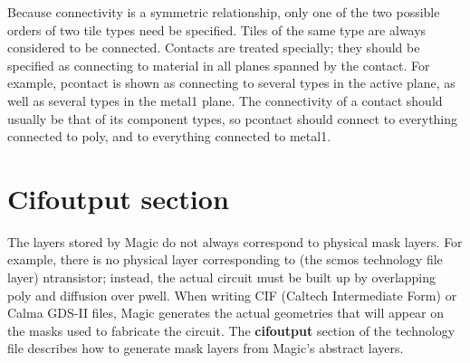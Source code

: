 \documentclass[letterpaper,twoside,12pt]{article}
\begin{document}
Because connectivity is a symmetric relationship, only one of
the two possible orders of two tile types need be specified.
Tiles of the same type
are always considered to be connected.
Contacts are treated specially; they should be specified as
connecting to material in all planes spanned by the contact.
For example, pcontact is shown as connecting to
several types in the active plane, as well as several types
in the metal1 plane.
The connectivity of a contact should usually be that
of its component types,
so pcontact should connect
to everything connected to poly, and
to everything connected to metal1.

\section{Cifoutput section}

The layers stored by Magic do not always correspond to physical
mask layers.  For example, there is no physical layer corresponding
to (the scmos technology file layer) ntransistor; instead, the actual
circuit must be built up by overlapping poly and diffusion over pwell.
When writing CIF (Caltech Intermediate Form) or Calma GDS-II files,
Magic generates the actual
geometries that will appear on the masks used to fabricate the
circuit.  The {\bfseries cifoutput} section of the technology file
describes how to generate mask layers from Magic's abstract layers.
\end{document}
